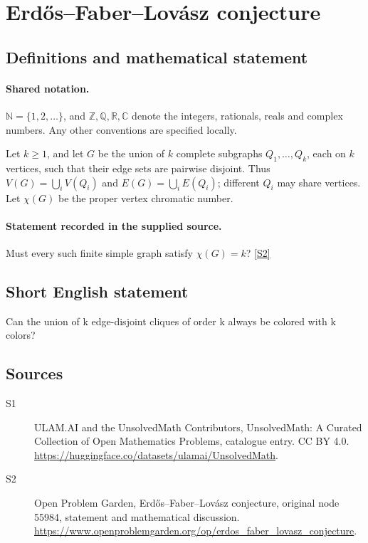 \documentclass[11pt]{article}
\newcommand{\sref}[2]{\hyperlink{source:#1:#2}{[S#2]}}
\begin{document}
\section{Erdős–Faber–Lovász conjecture}\label{statement}

\subsection{Definitions and mathematical statement}

\paragraph{Shared notation.}$\mathbb N=\{1,2,\ldots\}$, and $\mathbb Z,\mathbb Q,\mathbb R,\mathbb C$ denote the integers, rationals, reals and complex numbers. Any other conventions are specified locally.


Let $k\ge1$, and let $G$ be the union of $k$ complete subgraphs $Q_1,\ldots,Q_k$, each on $k$ vertices, such that their edge sets are pairwise disjoint. Thus $V(G)=\bigcup_iV(Q_i)$ and $E(G)=\bigcup_iE(Q_i)$; different $Q_i$ may share vertices. Let $\chi(G)$ be the proper vertex chromatic number.
\paragraph{Statement recorded in the supplied source.}
Must every such finite simple graph satisfy $\chi(G)=k$? \sref{statement}{2}
\subsection{Short English statement}
Can the union of k edge-disjoint cliques of order k always be colored with k colors?
\subsection{Sources}
\begin{description}
\item[\hypertarget{source:statement:1}{S1}] ULAM.AI and the UnsolvedMath Contributors, UnsolvedMath: A Curated Collection of Open Mathematics Problems, catalogue entry. CC BY 4.0. \url{https://huggingface.co/datasets/ulamai/UnsolvedMath}.
\item[\hypertarget{source:statement:2}{S2}] Open Problem Garden, Erdős–Faber–Lovász conjecture, original node 55984, statement and mathematical discussion. \url{https://www.openproblemgarden.org/op/erdos_faber_lovasz_conjecture}.
\end{description}
\label{end:statement}
\end{document}
